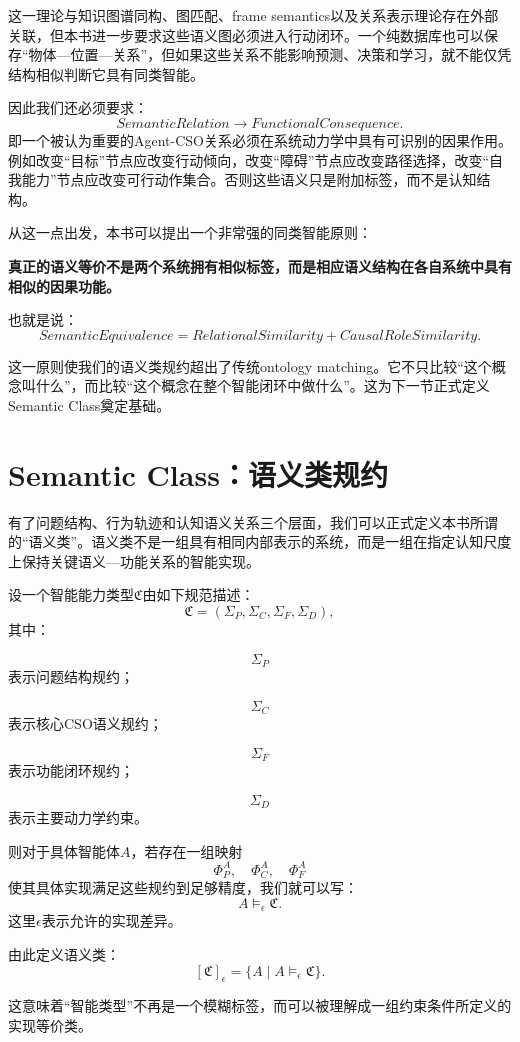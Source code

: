 这一理论与知识图谱同构、图匹配、frame semantics以及关系表示理论存在外部关联，但本书进一步要求这些语义图必须进入行动闭环。一个纯数据库也可以保存``物体—位置—关系''，但如果这些关系不能影响预测、决策和学习，就不能仅凭结构相似判断它具有同类智能。

因此我们还必须要求：
\[
SemanticRelation
\rightarrow
FunctionalConsequence.
\]
即一个被认为重要的Agent-CSO关系必须在系统动力学中具有可识别的因果作用。例如改变``目标''节点应改变行动倾向，改变``障碍''节点应改变路径选择，改变``自我能力''节点应改变可行动作集合。否则这些语义只是附加标签，而不是认知结构。

从这一点出发，本书可以提出一个非常强的同类智能原则：
\begin{proposition*}
\bfseries
真正的语义等价不是两个系统拥有相似标签，而是相应语义结构在各自系统中具有相似的因果功能。
\end{proposition*}
也就是说：
\[
SemanticEquivalence
=
RelationalSimilarity
+
CausalRoleSimilarity.
\]

这一原则使我们的语义类规约超出了传统ontology matching。它不只比较``这个概念叫什么''，而比较``这个概念在整个智能闭环中做什么''。这为下一节正式定义Semantic Class奠定基础。

\section{Semantic Class：语义类规约}

有了问题结构、行为轨迹和认知语义关系三个层面，我们可以正式定义本书所谓的``语义类''。语义类不是一组具有相同内部表示的系统，而是一组在指定认知尺度上保持关键语义—功能关系的智能实现。

设一个智能能力类型$\mathfrak C$由如下规范描述：
\[
\mathfrak C
=
(
\Sigma_P,
\Sigma_C,
\Sigma_F,
\Sigma_D
),
\]
其中：

\[
\Sigma_P
\]
表示问题结构规约；

\[
\Sigma_C
\]
表示核心CSO语义规约；

\[
\Sigma_F
\]
表示功能闭环规约；

\[
\Sigma_D
\]
表示主要动力学约束。

则对于具体智能体$A$，若存在一组映射
\[
\Phi_P^A,
\quad
\Phi_C^A,
\quad
\Phi_F^A
\]
使其具体实现满足这些规约到足够精度，我们就可以写：
\[
A\models_{\epsilon}\mathfrak C.
\]
这里$\epsilon$表示允许的实现差异。

由此定义语义类：
\[
\boxed{
[\mathfrak C]_{\epsilon}
=
\{
A\mid A\models_{\epsilon}\mathfrak C
\}.
}
\]

这意味着``智能类型''不再是一个模糊标签，而可以被理解成一组约束条件所定义的实现等价类。

